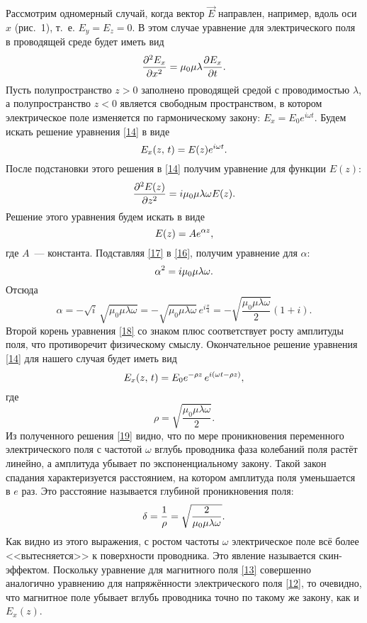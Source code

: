 

Рассмотрим одномерный случай, когда вектор $\vec{E}$ направлен, например, вдоль оси $x$ (рис.~1), т.~е. $E_y=E_z=0$. В этом
случае уравнение для электрического поля в проводящей среде будет иметь вид
\begin{equation} \eqmark{14}
\frac{\partial^2E_x}{\partial x^2}=\mu_0\mu\lambda\ddt{E_x}.
\end{equation}
Пусть полупространство $z>0$ заполнено проводящей средой с проводимостью $\lambda$, а полупространство $z<0$ является
свободным пространством, в котором электрическое поле изменяется по гармоническому закону: $E_x=E_0e^{i\omega t}$. Будем
искать решение уравнения \eqref{14} в виде
\begin{equation} \eqmark{15}
E_x(z,\,t)=E(z)e^{i\omega t}.
\end{equation}
После подстановки этого решения в \eqref{14} получим уравнение для функции $E(z)$:
\begin{equation} \eqmark{16}
\frac{\partial^2E(z)}{\partial z^2}=i\mu_0\mu\lambda\omega E(z).
\end{equation}
Решение этого уравнения будем искать в виде
\begin{equation} \eqmark{17}
E(z)=Ae^{\alpha z},
\end{equation}
где $A$~--- константа. Подставляя \eqref{17} в \eqref{16}, получим уравнение для $\alpha$:
\begin{equation} \eqmark{18}
\alpha^2=i\mu_0\mu\lambda\omega.
\end{equation}
Отсюда
\[
\alpha=-\sqrt{i}\,\sqrt{\mu_0\mu\lambda\omega}=-\sqrt{\mu_0\mu\lambda\omega}\,e^{i\frac{\pi}{4}}=-\sqrt{\frac{\mu_0\mu\lambda\omega}{2}}(1+i).
\]
Второй корень уравнения \eqref{18} со знаком плюс соответствует росту амплитуды поля, что противоречит физическому смыслу.
Окончательное решение уравнения \eqref{14} для нашего случая будет иметь вид
\begin{equation} \eqmark{19}
E_x(z,\,t)=E_0e^{-\rho z}\,e^{i(\omega t-\rho z)},
\end{equation}
где
\[
\rho=\sqrt{\frac{\mu_0\mu\lambda\omega}{2}}.
\]
Из полученного решения \eqref{19} видно, что по мере проникновения переменного электрического поля с частотой $\omega$ вглубь
проводника фаза колебаний поля растёт линейно, а амплитуда убывает по экспоненциальному закону. Такой закон спадания
характеризуется расстоянием, на котором амплитуда поля уменьшается в $e$ раз. Это расстояние называется глубиной
проникновения поля:
\begin{equation} \eqmark{20}
\delta=\frac{1}{\rho}=\sqrt{\frac{2}{\mu_0\mu\lambda\omega}}.
\end{equation}
Как видно из этого выражения, с ростом частоты $\omega$ электрическое поле всё более <<вытесняется>> к поверхности
проводника. Это явление называется скин-эффектом. Поскольку уравнение для магнитного поля \eqref{13} совершенно аналогично
уравнению для напряжённости электрического поля \eqref{12}, то очевидно, что магнитное поле убывает вглубь проводника
точно по такому же закону, как и $E_x(z)$.

